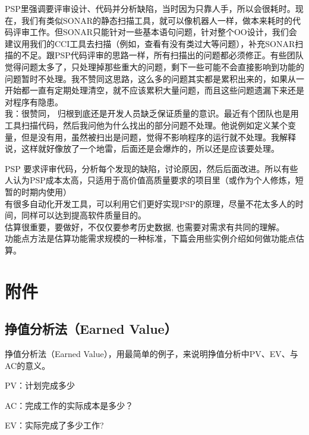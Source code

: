 {\begin{minipage}[t]{0.97\columnwidth}
PSP里强调要评审设计、代码并分析缺陷，当时因为只靠人手，所以会很耗时。现在，我们有类似SONAR的静态扫描工具，就可以像机器人一样，做本来耗时的代码评审工作。但SONAR只能针对一些基本语句问题，针对整个OO设计，我们会建议用我们的CCI工具去扫描（例如，查看有没有类过大等问题），补充SONAR扫描的不足。跟PSP代码评审的思路一样，所有扫描出的问题都必须修正。有些团队觉得问题太多了，只处理掉那些重大的问题，剩下一些可能不会直接影响到功能的问题暂时不处理。我不赞同这思路，这么多的问题其实都是累积出来的，如果从一开始都一直有定期处理清空，就不应该累积大量问题，而且这些问题遗漏下来还是对程序有隐患。\\
我：很赞同，
归根到底还是开发人员缺乏保证质量的意识。最近有个团队也是用工具扫描代码，然后我问他为什么找出的部分问题不处理。他说例如定义某个变量，但是没有用，虽然被扫出是问题，觉得不影响程序的运行就不处理。我解释说，这样就好像放了一个地雷，后面还是会爆炸的，所以还是应该要处理。\strut
\end{minipage}}

PSP
要求评审代码，分析每个发现的缺陷，讨论原因，然后后面改进。所以有些人认为PSP成本太高，只适用于高价值高质量要求的项目里（或作为个人修炼，短暂的时期内使用）\\
有很多自动化开发工具，可以利用它们更好实现PSP的原理，尽量不花太多人的时间，同样可以达到提高软件质量目的。\\
估算很重要，要做好，不仅仅要参考历史数据, 也需要对需求有共同的理解。\\
功能点方法是估算功能需求规模的一种标准，下篇会用些实例介绍如何做功能点估算。

\hypertarget{ux9644ux4ef6}{%
\section{附件}\label{ux9644ux4ef6}}

\hypertarget{ux6323ux503cux5206ux6790ux6cd5earned-value}{%
\subsection{挣值分析法（Earned
Value）}\label{ux6323ux503cux5206ux6790ux6cd5earned-value}}

挣值分析法（Earned
Value），用最简单的例子，来说明挣值分析中PV、EV、与AC的意义。

\begin{description}
\tightlist
\item[]
PV：计划完成多少

AC：完成工作的实际成本是多少？

EV：实际完成了多少工作?
\end{description}

